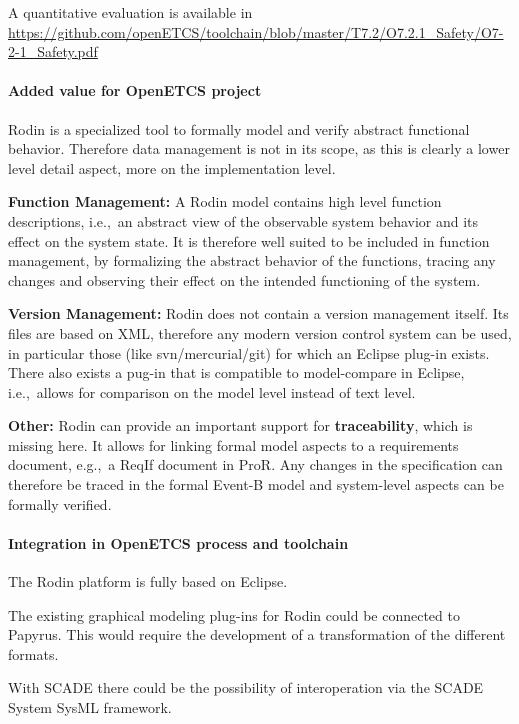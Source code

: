 A quantitative evaluation is available in \url{https://github.com/openETCS/toolchain/blob/master/T7.2/O7.2.1_Safety/O7-2-1_Safety.pdf}

\paragraph{Added value for OpenETCS project}


 Rodin is a specialized tool to formally model and verify abstract functional
  behavior. Therefore data management is not in its scope, as this is clearly a
  lower level detail aspect, more on the implementation level.

  \textbf{Function Management:} A Rodin model contains high level function
  descriptions, i.e.,\ an abstract view of the observable system behavior and
  its effect on the system state. It is therefore well suited to be included in
  function management, by formalizing the abstract behavior of the functions,
  tracing any changes and observing their effect on the intended functioning of
  the system.

  \textbf{Version Management:} Rodin does not contain a version management
  itself. Its files are based on XML, therefore any modern version control
  system can be used, in particular those (like svn/mercurial/git) for which an
  Eclipse plug-in exists. There also exists a pug-in that is compatible to
  model-compare in Eclipse, i.e.,\ allows for comparison on the model level
  instead of text level.

  \textbf{Other:} Rodin can provide an important support for
  \textbf{traceability}, which is missing here. It allows for linking formal
  model aspects to a requirements document, e.g.,\ a ReqIf document in ProR. Any
  changes in the specification can therefore be traced in the formal Event-B
  model and system-level aspects can be formally verified.

\paragraph{Integration in OpenETCS process and toolchain}

  The Rodin platform is fully based on Eclipse.

  The existing graphical modeling plug-ins for Rodin could be connected to
  Papyrus. This would require the development of a transformation of the
  different formats.

  With SCADE there could be the possibility of interoperation via the SCADE
  System SysML framework.

